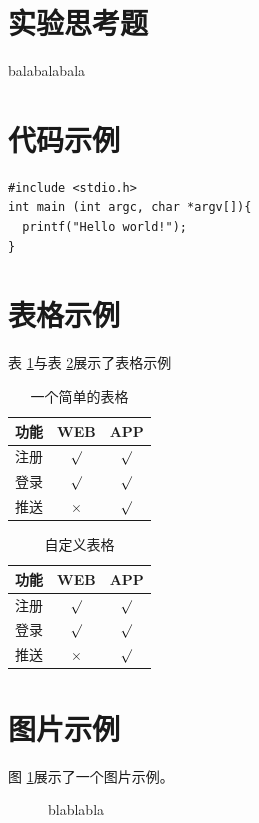 \documentclass[a4paper,11pt,UTF8]{ctexart}
\begin{document}
\section{实验思考题}
balabalabala

\begin{appendix}

\section{代码示例}

\begin{lstlisting}[caption={一段C代码},captionpos=b]
#include <stdio.h>
int main (int argc, char *argv[]){
  printf("Hello world!");
}
\end{lstlisting}

\section{表格示例}
表 \ref{tab:tab1}与表 \ref{tab:tab2}展示了表格示例
\begin{table}[!h!tbp]
\caption{一个简单的表格}\label{tab:tab1}
  \centering
  \begin{tabular}{|l|c|c|}
	\hline
	功能          &WEB         &APP         \\ \hline
	注册          &$\surd$     &$\surd$     \\ \hline
	登录          &$\surd$     &$\surd$     \\ \hline
	推送          &$\times$    &$\surd$     \\ \hline
\end{tabular}
\end{table}

\begin{table}[!h!tbp]
\caption{自定义表格}\label{tab:tab2}
  \centering
\begin{tabular*}{0.75\textwidth}{@{\extracolsep{\fill}}lcc}
    \toprule
    功能          &WEB         &APP         \\
    \midrule
    注册          &$\surd$     &$\surd$     \\
    登录          &$\surd$     &$\surd$     \\
    推送          &$\times$    &$\surd$     \\
    \bottomrule
\end{tabular*}
\end{table}


\section{图片示例}
图 \ref{fig:logo}展示了一个图片示例。
\begin{figure}[htbp]
\centering
{}
\caption{blablabla}
\label{fig:logo}
\end{figure}


\end{appendix}
\end{document}
